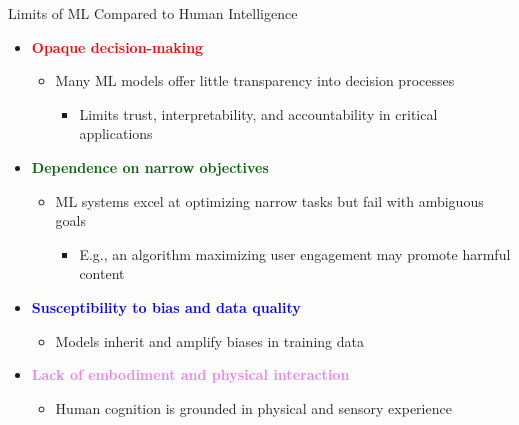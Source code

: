 \documentclass[
  10pt,
  ignorenonframetext,
]{beamer}
\providecommand{\tightlist}{%
  \setlength{\itemsep}{0pt}\setlength{\parskip}{0pt}}
\begin{document}
\begin{frame}{Limits of ML Compared to Human Intelligence}
\label{limits-of-ml-compared-to-human-intelligence-1}
\begin{itemize}
\tightlist
\item
  \textbf{\textcolor{red}{Opaque decision-making}}

  \begin{itemize}
  \tightlist
  \item
    Many ML models offer little transparency into decision processes

    \begin{itemize}
    \tightlist
    \item
      Limits trust, interpretability, and accountability in critical
      applications
    \end{itemize}
  \end{itemize}
\item
  \textbf{\textcolor{darkgreen}{Dependence on narrow objectives}}

  \begin{itemize}
  \tightlist
  \item
    ML systems excel at optimizing narrow tasks but fail with ambiguous
    goals

    \begin{itemize}
    \tightlist
    \item
      E.g., an algorithm maximizing user engagement may promote harmful
      content
    \end{itemize}
  \end{itemize}
\item
  \textbf{\textcolor{blue}{Susceptibility to bias and data quality}}

  \begin{itemize}
  \tightlist
  \item
    Models inherit and amplify biases in training data
  \end{itemize}
\item
  \textbf{\textcolor{violet}{Lack of embodiment and physical interaction}}

  \begin{itemize}
  \tightlist
  \item
    Human cognition is grounded in physical and sensory experience
  \end{itemize}
\end{itemize}
\end{frame}
\end{document}
